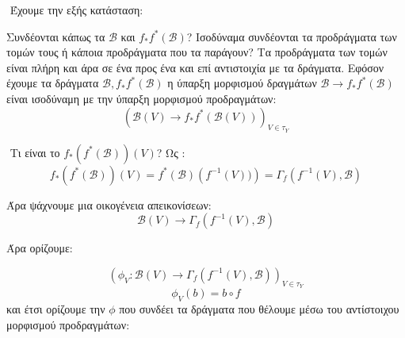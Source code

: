 \vspace*{0.3cm}

$ $\newline
Έχουμε την εξής κατάσταση:

\begin{figure}[H]
    \centering
\end{figure}
\noindent Συνδέονται κάπως τα $\mathcal{B}$ και $f_*f^*(\mathcal{B})$? Ισοδύναμα συνδέονται τα προδράγματα των τομών τους ή κάποια προδράγματα που τα παράγουν? Τα προδράγματα των τομών είναι πλήρη και άρα σε ένα προς ένα και επί αντιστοιχία με τα δράγματα. Εφόσον έχουμε τα δράγματα $\mathcal B, f_*f^*(\mathcal{B})$ η ύπαρξη μορφισμού δραγμάτων $\mathcal{B} \longrightarrow f_*f^*(\mathcal{B})$ είναι ισοδύναμη με την ύπαρξη μορφισμού προδραγμάτων:
$$(\mathcal{B}(V) \longrightarrow f_*f^*(\mathcal{B}(V)))_{V\in \tau_Y}$$

$ $\newline
Τι είναι το $f_*\left(f^*(\mathcal{B})\right)(V)$? Ως :
$$ f_*\left(f^*(\mathcal{B})\right)(V) = f^*(\mathcal{B}) \left(f^{-1}(V))\right)  = \Gamma_f (f^{-1}(V), \mathcal B)$$


\noindent Άρα ψάχνουμε μια οικογένεια απεικονίσεων:
$$\mathcal B (V) \longrightarrow \Gamma_f (f^{-1}(V),\mathcal{B})$$

\begin{figure}[H]
    \centering
\end{figure}

\noindent Άρα ορίζουμε:

$$(\phi_V : \mathcal B (V) \longrightarrow \Gamma_f (f^{-1}(V),\mathcal{B}))_{V \in \tau_Y}$$
$$\phi_V (b) = b\circ f$$ και έτσι ορίζουμε την $\phi$ που συνδέει τα δράγματα που θέλουμε μέσω του αντίστοιχου μορφισμού προδραγμάτων:

